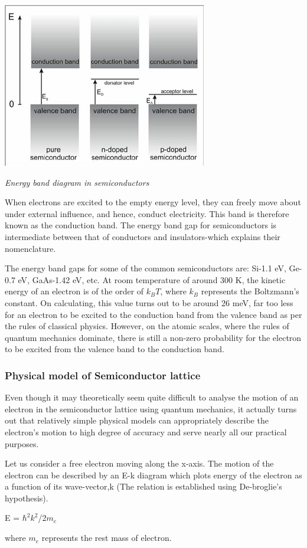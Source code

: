 \documentclass[12 pt]{article}
\begin{document}
  \par
   \begin{center}
   \includegraphics{ebd_1_50.png}
   \end{center}
    \begin{center}
      \emph{ Energy band diagram in semiconductors}
  \end{center}
\par
 When electrons are excited to the empty energy level, they can freely move about under external influence, and hence, conduct electricity. This band is therefore known as the conduction band. The energy band gap for semiconductors is intermediate between that of conductors and insulators-which explains their nomenclature.
\par
The energy band gaps for some of the common semiconductors are: Si-1.1 eV, Ge-0.7 eV, GaAs-1.42 eV, etc. At room temperature of around 300 K, the kinetic energy of an electron is of the order of $k_{B}T$, where $k_{B}$ represents the Boltzmann's constant. On calculating, this value turns out to be around 26 meV, far too less for an electron to be excited to the conduction band from the valence band as per the rules of classical physics. However, on the atomic scales, where the rules of quantum mechanics dominate, there is still a non-zero probability for the electron to be excited from the valence band to the conduction band. 

\subsubsection{Physical model of Semiconductor lattice}
Even though it may theoretically seem quite difficult to analyse the motion of an electron in the semiconductor lattice using quantum mechanics, it actually turns out that relatively simple physical models can appropriately describe the electron's motion to high degree of accuracy and serve nearly all our practical purposes.\par
Let us consider a free electron moving along the x-axis. The motion of the electron can be described by an E-k diagram which plots energy of the electron as a function of its wave-vector,k (The relation is established using De-broglie's hypothesis).
\begin{center}
    E = $\hbar^{2}k^{2}$/2$m_{e}$
\end{center}
where $m_{e}$ represents the rest mass of electron.\newline
\end{document}
